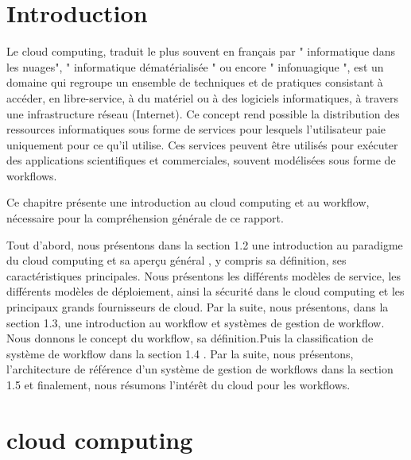  	 \section{Introduction}
 	  
    
    Le cloud computing, traduit le plus souvent en français par " informatique dans les nuages", " informatique dématérialisée " ou encore " infonuagique ", est un domaine qui regroupe un ensemble de techniques et de pratiques consistant à accéder, en libre-service, à du matériel ou à des logiciels informatiques, à travers une infrastructure réseau (Internet). Ce concept rend possible la distribution des ressources informatiques sous forme de services pour lesquels l'utilisateur paie uniquement pour ce qu'il utilise. Ces services peuvent être utilisés pour exécuter des applications scientifiques et commerciales, souvent modélisées sous forme de workflows.
     
    Ce chapitre présente une introduction au cloud computing et au workflow, nécessaire pour la compréhension générale de ce rapport.
   
   Tout d’abord, nous présentons dans la section 1.2 une introduction au paradigme du cloud computing et  sa aperçu général , y compris sa définition, ses caractéristiques principales. Nous présentons les différents modèles de service, les différents modèles de déploiement, ainsi la sécurité dans le  cloud computing et les principaux grands fournisseurs de cloud. Par la suite, nous présentons, dans la section 1.3, une introduction au workflow et systèmes de gestion de workflow. Nous donnons le concept du workflow, sa définition.Puis la classification de système de workflow  dans la section 1.4   . Par la suite, nous présentons, l’architecture de référence d’un système de gestion de workflows dans la section 1.5 et finalement, nous résumons l'intérêt du cloud pour les workflows.
   
    \section{cloud computing}
